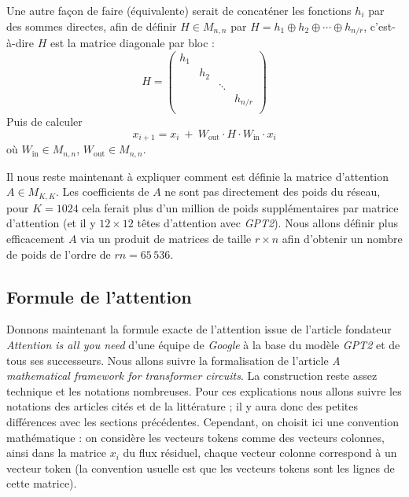 \documentclass[11pt,class=report,crop=false]{standalone}
\begin{document}

Une autre façon de faire (équivalente) serait de concaténer les fonctions $h_i$ par des sommes directes, afin de définir $H \in M_{n,n}$ par 
$H = h_1 \oplus h_2 \oplus \cdots \oplus h_{n/r}$, c'est-à-dire $H$ est la matrice diagonale par bloc :
$$H = \begin{pmatrix}
	h_1 & && \\ 
	& h_2 & &  \\
	& & \ddots &  \\
	& & & h_{n/r} \\ 			
\end{pmatrix}$$
Puis de calculer 
$$x_{i+1} = x_i \ + \ W_{\text{out}}\cdot H \cdot W_{\text{in}} \cdot x_i$$
où $W_{\text{in}} \in M_{n,n}$, $W_{\text{out}} \in M_{n,n}$.
	

Il nous reste maintenant à expliquer comment est définie la matrice d'attention $A \in M_{K,K}$.
Les coefficients de $A$ ne sont pas directement des poids du réseau, pour $K = 1024$ cela ferait plus d'un million de poids supplémentaires par matrice d'attention (et il y $12 \times 12$ têtes d'attention avec \emph{GPT2}). Nous allons définir plus efficacement $A$ via un produit de matrices de taille $r\times n$ afin d'obtenir un nombre de poids de l'ordre de $rn = 65\,536$.


\subsection{Formule de l'attention}

Donnons maintenant la formule exacte de l'attention issue de l'article fondateur \emph{Attention is all you need} d'une équipe de \emph{Google} à la base du modèle \emph{GPT2} et de tous ses successeurs.
Nous allons suivre la formalisation de l'article \emph{A mathematical framework for transformer circuits}. La construction reste assez technique et les notations nombreuses.
Pour ces explications nous allons suivre les notations des articles cités et de la littérature ; il y aura donc des petites différences avec les sections précédentes. Cependant, on choisit ici une convention mathématique : on considère les vecteurs tokens comme des vecteurs colonnes, ainsi dans la matrice $x_i$ du flux résiduel, chaque vecteur colonne correspond à un vecteur token (la convention usuelle est que les vecteurs tokens sont les lignes de cette matrice).

\bigskip
\end{document}

